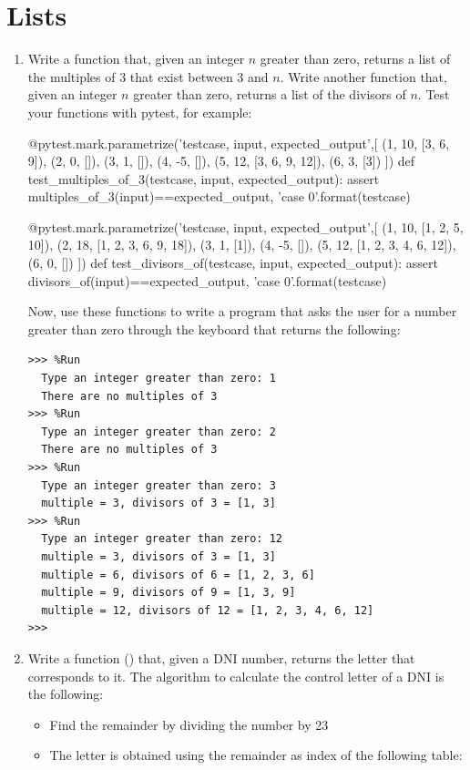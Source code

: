 \documentclass[
  fontsize=10pt,
  a4paper,
]{scrartcl}
\begin{document}
\section{Lists}

\begin{enumerate}


\item Write a function that, given an integer $n$ greater than zero, returns a list of the multiples of 3 that exist between 3 and $n$. Write another function that, given an integer $n$ greater than zero, returns a list of the divisors of $n$. Test your functions with pytest, for example:

\begin{python}
@pytest.mark.parametrize('testcase, input, expected_output',[
    (1, 10, [3, 6, 9]),
    (2, 0, []),
    (3, 1, []),
    (4, -5, []),
    (5, 12, [3, 6, 9, 12]),
    (6, 3, [3])
    ])
def test_multiples_of_3(testcase, input, expected_output):
    assert multiples_of_3(input)==expected_output, 'case {0}'.format(testcase)

@pytest.mark.parametrize('testcase, input, expected_output',[
    (1, 10, [1, 2, 5, 10]),
    (2, 18, [1, 2, 3, 6, 9, 18]),
    (3, 1, [1]),
    (4, -5, []),
    (5, 12, [1, 2, 3, 4, 6, 12]),
    (6, 0, [])
    ])
def test_divisors_of(testcase, input, expected_output):
    assert divisors_of(input)==expected_output, 'case {0}'.format(testcase)
\end{python}

Now, use these functions to write a  program that asks the user for a number greater than zero through the keyboard that returns the following:

\begin{Verbatim}[frame=single]
>>> %Run 
  Type an integer greater than zero: 1
  There are no multiples of 3
>>> %Run 
  Type an integer greater than zero: 2
  There are no multiples of 3
>>> %Run 
  Type an integer greater than zero: 3
  multiple = 3, divisors of 3 = [1, 3]
>>> %Run 
  Type an integer greater than zero: 12
  multiple = 3, divisors of 3 = [1, 3]
  multiple = 6, divisors of 6 = [1, 2, 3, 6]
  multiple = 9, divisors of 9 = [1, 3, 9]
  multiple = 12, divisors of 12 = [1, 2, 3, 4, 6, 12]
>>> 
\end{Verbatim}


\item Write a function () that, given a DNI number, returns the letter that corresponds to it.
%
The algorithm to calculate the control letter of a DNI is the following:
\begin{itemize}
\item Find the remainder by dividing the number by 23
\item The letter is obtained using the remainder as
index of the following table:
  

\end{itemize}
\end{enumerate}
\end{document}

